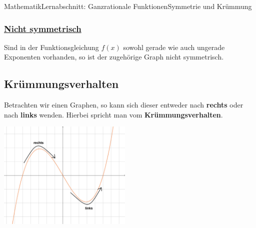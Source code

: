 \documentclass[11pt,twocolumn,oneside,openany,headings=optiontotoc,11pt,numbers=noenddot]{article}
\begin{document}
\begin{worksheet}{Mathematik}{Lernabschnitt: Ganzrationale Funktionen}{Symmetrie und Krümmung}
		\subsubsection{\underline{Nicht symmetrisch}}
		Sind in der Funktionsgleichung \(f(x)\) sowohl gerade wie auch ungerade Exponenten vorhanden, so ist der zugehörige Graph nicht symmetrisch.
		\subsection{Krümmungsverhalten}
		Betrachten wir einen Graphen, so kann sich dieser entweder nach \textbf{rechts} oder nach \textbf{links} wenden. Hierbei spricht man vom \textbf{Krümmungsverhalten}.\\
		\par\noindent
		\includegraphics[width=0.48\textwidth]{../99_Bilder/RL.jpg}\\
	\end{worksheet}
\end{document}
